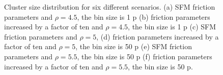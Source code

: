 \begin{figure}[!htbp]
\caption[width=0.47\columnwidth]{Cluster size distribution for six different scenarios. (a) SFM friction parameters and $\rho=4.5$, the bin size is 1 p (b) friction parameters increased by a factor of ten and $\rho=4.5$, the bin size is 1 p (c) SFM friction parameters and $\rho=5$, (d) friction parameters increased by a factor of ten and $\rho=5$, the bin size is 50 p (e) SFM friction parameters and $\rho=5.5$, the bin size is 50 p (f) friction parameters increased by a factor of ten and $\rho=5.5$, the bin size is 50 p.}
\label{cluster_distribution}
\end{figure}






